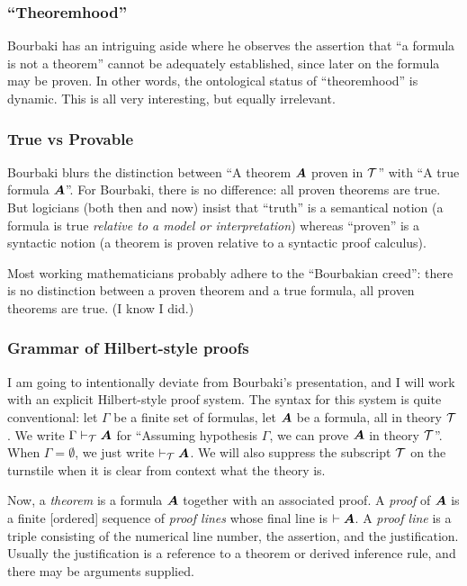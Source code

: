 \subsubsection{``Theoremhood''}
Bourbaki has an intriguing aside where he observes the assertion that ``a
formula is not a theorem'' cannot be adequately established, since later
on the formula may be proven. In other words, the ontological status of
``theoremhood'' is dynamic. This is all very interesting, but equally
irrelevant.

\subsubsection{True vs Provable}
Bourbaki blurs the distinction between ``A theorem $\boldsymbol{A}$ proven in
$\mathcal{T}$'' with ``A true formula $\boldsymbol{A}$''. For Bourbaki,
there is no difference: all proven theorems are true. But logicians
(both then and now) insist that ``truth'' is a semantical notion (a
formula is true \emph{relative to a model or interpretation}) whereas
``proven'' is a syntactic notion (a theorem is proven relative to a
syntactic proof calculus).

Most working mathematicians probably adhere to the ``Bourbakian creed'':
there is no distinction between a proven theorem and a true formula, all
proven theorems are true. (I know I did.)

\subsubsection{Grammar of Hilbert-style proofs}
I am going to intentionally deviate from Bourbaki's presentation, and I
will work with an explicit Hilbert-style proof system. The syntax for
this system is quite conventional: let $\Gamma$ be a finite set of
formulas, let $\boldsymbol{A}$ be a formula, all in theory
$\mathcal{T}$. We write $\Gamma\vdash_{\mathcal{T}}\boldsymbol{A}$ for
``Assuming hypothesis $\Gamma$, we can prove $\boldsymbol{A}$ in
theory $\mathcal{T}$''. When $\Gamma=\emptyset$, we just write
$\vdash_{\mathcal{T}}\boldsymbol{A}$. We will also suppress the
subscript $\mathcal{T}$ on the turnstile when it is clear from context
what the theory is.

Now, a \emph{theorem} is a formula $\boldsymbol{A}$ together with an
associated proof. A \emph{proof} of $\boldsymbol{A}$ is a finite
[ordered] sequence of \emph{proof lines} whose final line is
$\vdash\boldsymbol{A}$. A \emph{proof line} is a triple consisting of
the numerical line number, the assertion, and the justification. Usually
the justification is a reference to a theorem or derived inference rule,
and there may be arguments supplied.

